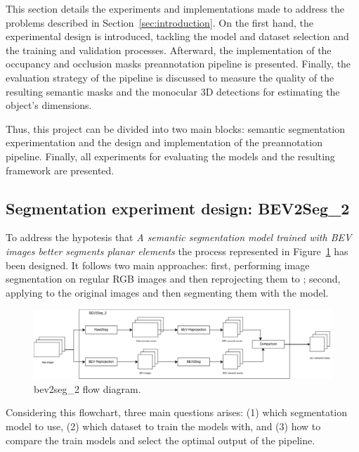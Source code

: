 
This section details the experiments and implementations made to address the problems described in Section~\ref{sec:introduction}. On the first hand, the experimental design is introduced, tackling the model and dataset selection and the training and validation processes. Afterward, the implementation of the occupancy and occlusion masks preannotation pipeline is presented. Finally, the evaluation strategy of the pipeline is discussed to measure the quality of the resulting semantic masks and the monocular 3D detections for estimating the object's dimensions.

Thus, this project can be divided into two main blocks:  semantic segmentation experimentation and the design and implementation of the preannotation pipeline. Finally, all experiments for evaluating the models and the resulting framework are presented.  

\subsection{Segmentation experiment design: BEV2Seg\_2}
\label{sec:bev2seg_2}

To address the hypotesis that \textit{A semantic segmentation model trained with BEV images better segments planar elements} the process represented in Figure~\ref{fig:beg2seg_2_flow} has been designed. It follows two main approaches: first, performing image segmentation on regular RGB images and then reprojecting them to ; second, applying  to the original images and then segmenting them with the model.

\begin{figure}[h!]
    \centering
    \includegraphics[width=\linewidth]{./images/methodology/bev2seg_2_flow.png}
    \caption{bev2seg\_2 flow diagram.}
    \label{fig:beg2seg_2_flow}
\end{figure}

Considering this flowchart, three main questions arises: (1) which segmentation model to use, (2) which dataset to train the models with, and (3) how to compare the train models and select the optimal output of the pipeline. 

